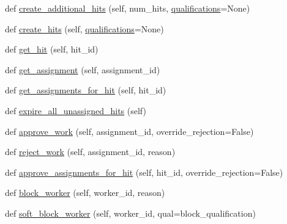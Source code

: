 \begin{DoxyCompactItemize}
\item 
def \hyperlink{classparlai_1_1mturk_1_1core_1_1mturk__manager_1_1MTurkManager_ae192d527cf9dcf694d8111fb283aa5d7}{create\+\_\+additional\+\_\+hits} (self, num\+\_\+hits, \hyperlink{classparlai_1_1mturk_1_1core_1_1mturk__manager_1_1MTurkManager_a7081daf8eaf838de1f220dd0074abe42}{qualifications}=None)
\item 
def \hyperlink{classparlai_1_1mturk_1_1core_1_1mturk__manager_1_1MTurkManager_acd01b6d3cd60d04e679b2bdab7b0a09d}{create\+\_\+hits} (self, \hyperlink{classparlai_1_1mturk_1_1core_1_1mturk__manager_1_1MTurkManager_a7081daf8eaf838de1f220dd0074abe42}{qualifications}=None)
\item 
def \hyperlink{classparlai_1_1mturk_1_1core_1_1mturk__manager_1_1MTurkManager_ab4276a818e7845b08f9f4c08920050dc}{get\+\_\+hit} (self, hit\+\_\+id)
\item 
def \hyperlink{classparlai_1_1mturk_1_1core_1_1mturk__manager_1_1MTurkManager_a986cd32c3359df8228feca69d3ba7637}{get\+\_\+assignment} (self, assignment\+\_\+id)
\item 
def \hyperlink{classparlai_1_1mturk_1_1core_1_1mturk__manager_1_1MTurkManager_a87d3096941e232227de762b3a8260f3d}{get\+\_\+assignments\+\_\+for\+\_\+hit} (self, hit\+\_\+id)
\item 
def \hyperlink{classparlai_1_1mturk_1_1core_1_1mturk__manager_1_1MTurkManager_a063250ea0ea08fe75ab3bb5aee637138}{expire\+\_\+all\+\_\+unassigned\+\_\+hits} (self)
\item 
def \hyperlink{classparlai_1_1mturk_1_1core_1_1mturk__manager_1_1MTurkManager_a0accb6612484648ec2666c01a3597cf8}{approve\+\_\+work} (self, assignment\+\_\+id, override\+\_\+rejection=False)
\item 
def \hyperlink{classparlai_1_1mturk_1_1core_1_1mturk__manager_1_1MTurkManager_a06b4f16cfaf41feb192c79fcfa7407a3}{reject\+\_\+work} (self, assignment\+\_\+id, reason)
\item 
def \hyperlink{classparlai_1_1mturk_1_1core_1_1mturk__manager_1_1MTurkManager_a67335e20ae360682d0b5681a7446492e}{approve\+\_\+assignments\+\_\+for\+\_\+hit} (self, hit\+\_\+id, override\+\_\+rejection=False)
\item 
def \hyperlink{classparlai_1_1mturk_1_1core_1_1mturk__manager_1_1MTurkManager_a10c0ba44b2e46b1644620e2d496458af}{block\+\_\+worker} (self, worker\+\_\+id, reason)
\item 
def \hyperlink{classparlai_1_1mturk_1_1core_1_1mturk__manager_1_1MTurkManager_aa9b385ef48553d3150e195fe82d24c88}{soft\+\_\+block\+\_\+worker} (self, worker\+\_\+id, qual=\textquotesingle{}block\+\_\+qualification\textquotesingle{})

\end{DoxyCompactItemize}

